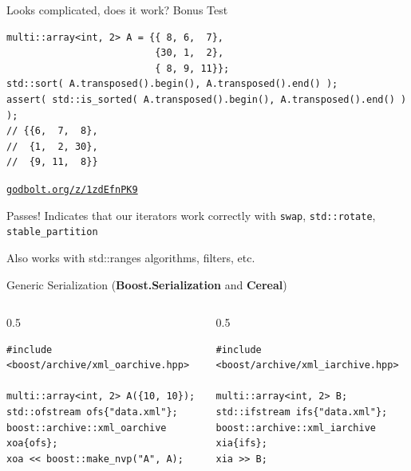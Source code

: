 \begin{frame}[fragile]{Looks complicated, does it work? Bonus Test}
\begin{lstlisting}
multi::array<int, 2> A = {{ 8, 6,  7},
                          {30, 1,  2},
                          { 8, 9, 11}};
std::sort( A.transposed().begin(), A.transposed().end() );
assert( std::is_sorted( A.transposed().begin(), A.transposed().end() ) );
// {{6,  7,  8},
//  {1,  2, 30},
//  {9, 11,  8}}
\end{lstlisting}
{\raggedleft\href{https://godbolt.org/z/1zdEfnPK9}{\texttt{godbolt.org/z/1zdEfnPK9}}\par}

{
\begin{alertblock}{Passes!}
  Indicates that our iterators work correctly with \lstinline|swap|, \lstinline|std::rotate|, \lstinline|stable_partition|
\end{alertblock}
}

\begin{block}{}
  Also works with std::ranges algorithms, filters, etc.
\end{block}
\end{frame}

\begin{frame}[fragile]{Generic Serialization (\textbf{Boost.Serialization} and \textbf{Cereal})}

\begin{columns}[T]
\begin{column}{0.5\textwidth}
\begin{lstlisting}
#include <boost/archive/xml_oarchive.hpp>

multi::array<int, 2> A({10, 10});
std::ofstream ofs{"data.xml"};
boost::archive::xml_oarchive xoa{ofs};
xoa << boost::make_nvp("A", A);
\end{lstlisting}
\end{column}
\begin{column}{0.5\textwidth}
\begin{lstlisting}
#include <boost/archive/xml_iarchive.hpp>

multi::array<int, 2> B;
std::ifstream ifs{"data.xml"};
boost::archive::xml_iarchive xia{ifs};
xia >> B;
\end{lstlisting}
\end{column}
\end{columns}

\begin{center}
  
\end{center}
\end{frame}

